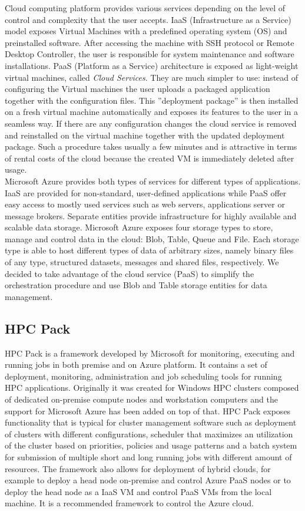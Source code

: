 \documentclass[3p,times]{elsarticle}
\begin{document}
Cloud computing platform provides various services depending on the level of control and complexity that the user accepts. IaaS (Infrastructure as a Service) model exposes Virtual Machines with a predefined operating system (OS) and preinstalled software. After accessing the machine with SSH protocol or Remote Desktop Controller, the user is responsible for system maintenance and software installations. PaaS (Platform as a Service) architecture is exposed as light-weight virtual machines, called {\it Cloud Services}. They are much simpler to use: instead of configuring the Virtual machines the user uploads a packaged application together with the configuration files. This ''deployment package'' is then installed on a fresh virtual machine automatically and exposes its features to the user in a seamless way. If there are any configuration changes the cloud service is removed and reinstalled on the virtual machine together with the updated deployment package. Such a procedure takes usually a few minutes and is  attractive in terms of rental costs of the cloud because the created VM is immediately deleted after usage. \\
Microsoft Azure provides both types of services for different types of applications. IaaS are provided for non-standard, user-defined applications while PaaS offer easy access to mostly used services such as web servers, applications server or message brokers. Separate entities provide infrastructure for highly available and scalable data storage. Microsoft Azure exposes four storage types to store, manage and control data in the cloud: Blob, Table, Queue and File. Each storage type is able to host different types of data of arbitrary sizes, namely binary files of any type, structured datasets, messages and shared files, respectively. We decided to take advantage of the cloud service (PaaS) to simplify the orchestration procedure and use Blob and Table storage entities for data management. 

\subsection{HPC Pack}

HPC Pack is a framework developed by Microsoft for monitoring, executing and running jobs in both premise and on Azure platform. It contains a set of deployment, monitoring, administration and job scheduling tools for running HPC applications. Originally it was created for Windows HPC clusters composed of dedicated on-premise compute nodes and workstation computers and the support for Microsoft Azure has been added on top of that. HPC Pack exposes functionality that is typical for cluster management software such as deployment of clusters with different configurations, scheduler that maximizes an utilization of the cluster based on priorities, policies and usage patterns and a batch system for submission of multiple short and long running jobs with different amount of resources. The framework also allows for deployment of hybrid clouds, for example to deploy a head node on-premise and control Azure PaaS nodes or to deploy the head node as a IaaS VM and control PaaS VMs from the local machine. It is a recommended framework to control the Azure cloud.
\end{document}
